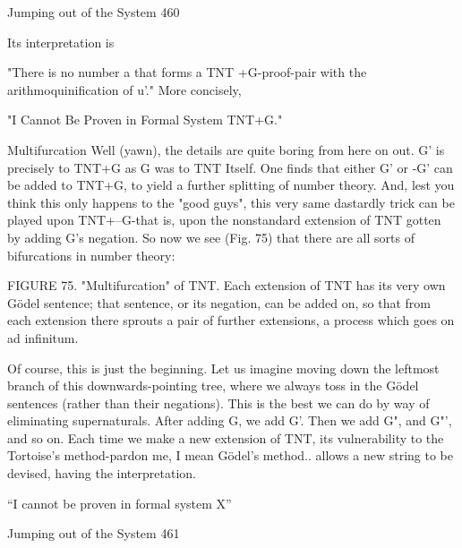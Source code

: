 Jumping out of the System                                                              460

Its interpretation is

                  "There is no number a that forms a TNT +G-proof-pair
                            with the arithmoquinification of u'."
More concisely,

                        "I Cannot Be Proven in Formal System TNT+G."

                                      Multifurcation
Well (yawn), the details are quite boring from here on out. G' is precisely to TNT+G as
G was to TNT Itself. One finds that either G' or -G' can be added to TNT+G, to yield a
further splitting of number theory. And, lest you think this only happens to the "good
guys", this very same dastardly trick can be played upon TNT+--G-that is, upon the
nonstandard extension of TNT gotten by adding G's negation. So now we see (Fig. 75)
that there are all sorts of bifurcations in number theory:




FIGURE 75. "Multifurcation" of TNT. Each extension of TNT has its very own Gödel
sentence; that sentence, or its negation, can be added on, so that from each extension
there sprouts a pair of further extensions, a process which goes on ad infinitum.

Of course, this is just the beginning. Let us imagine moving down the leftmost branch of
this downwards-pointing tree, where we always toss in the Gödel sentences (rather than
their negations). This is the best we can do by way of eliminating supernaturals. After
adding G, we add G'. Then we add G", and G"', and so on. Each time we make a new
extension of TNT, its vulnerability to the Tortoise's method-pardon me, I mean Gödel’s
method.. allows a new string to be devised, having the interpretation.

                            “I cannot be proven in formal system X”




Jumping out of the System                                                                461

